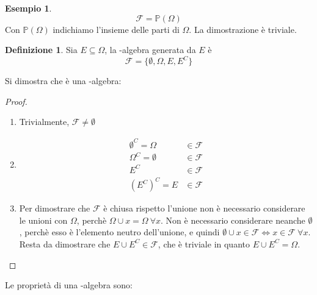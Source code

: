\documentclass{article}
\theoremstyle{plain}
\theoremstyle{definition}
\newtheorem{definizione}{Definizione}[section]
\newtheorem{esempio}{Esempio}[section]
\theoremstyle{remark}
\begin{document}
\begin{esempio}
	\begin{equation*}
		\mathcal{F}=\mathds{P}(\Omega)
	\end{equation*}
	Con $\mathds{P}(\Omega)$ indichiamo l'insieme delle parti di $\Omega$. La dimostrazione è triviale.
\end{esempio}
\begin{definizione}
	Sia $E\subseteq\Omega$, la \sigma-algebra generata da $E$ è
	\begin{equation*}
		\mathcal{F}=\{\emptyset,\Omega,E,E^C\}
	\end{equation*}
\end{definizione}
Si dimostra che è una \sigma-algebra:
\begin{proof}
	\begin{enumerate}
		\item Trivialmente, $\mathcal{F}\neq\emptyset$
		\item 
		\begin{align*}
			\emptyset^C=\Omega&\in\mathcal{F}\\
			\Omega^C=\emptyset&\in\mathcal{F}\\
			E^C&\in\mathcal{F}\\
			(E^C)^C=E&\in\mathcal{F}
		\end{align*}
		\item Per dimostrare che $\mathcal{F}$ è chiusa rispetto l'unione non è necessario considerare le unioni con $\Omega$, perchè $\Omega\cup x=\Omega\ \forall x$. Non è necessario considerare neanche $\emptyset$, perchè esso è l'elemento neutro dell'unione, e quindi $\emptyset\cup x\in\mathcal{F}\Leftrightarrow x\in\mathcal{F}\ \forall x$. Resta da dimostrare che $E\cup E^C\in\mathcal{F}$, che è triviale in quanto $E\cup E^C=\Omega$.
	\end{enumerate}
\end{proof}
Le proprietà di una \sigma-algebra sono:
\end{document}
